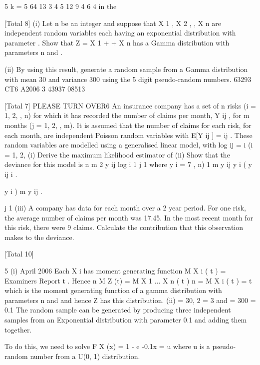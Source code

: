 \documentclass[a4paper,12pt]{article}
\begin{document}
5
k = 5
64%
13%
3%
4%
5%
12%
9%
4%
6%
4%
in the

[Total 8]
(i) Let n be an integer and suppose that X 1 , X 2 , , X n are independent random
variables each having an exponential distribution with parameter . Show that
Z = X 1 + + X n has a Gamma distribution with parameters n and .

(ii) By using this result, generate a random sample from a Gamma distribution
with mean 30 and variance 300 using the 5 digit pseudo-random numbers.
63293
CT6 A2006 3
43937
08513

[Total 7]
PLEASE TURN OVER6
An insurance company has a set of n risks (i = 1, 2, , n) for which it has recorded
the number of claims per month, Y ij , for m months (j = 1, 2, , m).
It is assumed that the number of claims for each risk, for each month, are independent
Poisson random variables with
E[Y ij ] =
ij .
These random variables are modelled using a generalised linear model, with
log
ij
=
i
(i = 1, 2,
(i) Derive the maximum likelihood estimator of (ii) Show that the deviance for this model is
n
m
2
y ij log
i 1 j 1
where y i =
7
, n)
1
m
y ij
y i
( y ij
i .

y i )
m
y ij .

j 1
(iii) A company has data for each month over a 2 year period. For one risk, the
average number of claims per month was 17.45. In the most recent month for
this risk, there were 9 claims. Calculate the contribution that this observation
makes to the deviance.

[Total 10]


5
(i)
April 2006
Each X i has moment generating function M X i ( t ) =
Examiners Report
t
. Hence
n
M Z (t) = M X 1
... X n ( t )
n
= M X i ( t ) =
t
which is the moment generating function of a gamma distribution with parameters n and and hence Z has this distribution.
(ii)
= 30,
2
= 3 and
= 300
= 0.1
The random sample can be generated by producing three independent samples from an Exponential distribution with parameter 0.1 and adding them together.

To do this, we need to solve
F X (x) = 1 - e -0.1x = u
where u is a pseudo-random number from a U(0, 1) distribution.
\end{document}
